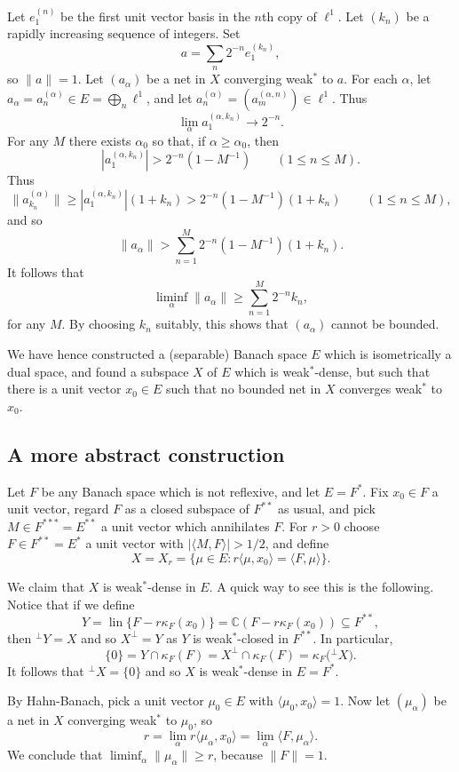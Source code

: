 \documentclass[a4paper,12pt]{article}
\theoremstyle{plain}
\theoremstyle{definition}
\newcommand{\ip}[2]{\langle{#1},{#2}\rangle}
\newcommand{\lin}{\operatorname{lin}}
\begin{document}
Let $e^{(n)}_1$ be the first unit vector basis in the $n$th copy of $\ell^1$.  Let $(k_n)$ be a
rapidly increasing sequence of integers.  Set
\[ a = \sum_n 2^{-n} e^{(k_n)}_1, \]
so $\|a\|=1$.  Let $(a_\alpha)$ be a net in $X$ converging weak$^*$ to $a$.  For each $\alpha$,
let $a_\alpha = a^{(\alpha)}_n \in E = \bigoplus_n \ell^1$, and let $a^{(\alpha)}_n
= (a^{(\alpha,n)}_m) \in \ell^1$.  Thus
\[ \lim_\alpha a^{(\alpha,k_n)}_1 \rightarrow 2^{-n}. \]
For any $M$ there exists $\alpha_0$ so that, if $\alpha\geq \alpha_0$, then
\[ |a^{(\alpha,k_n)}_1| > 2^{-n}(1-M^{-1}) \qquad (1 \leq n \leq M). \]
Thus
\[ \|a^{(\alpha)}_{k_n}\| \geq |a^{(\alpha,k_n)}_1|(1+k_n) > 2^{-n}(1-M^{-1})(1+k_n)
\qquad (1 \leq n \leq M), \]
and so
\[ \|a_\alpha\| > \sum_{n=1}^M 2^{-n}(1-M^{-1})(1+k_n). \]
It follows that
\[ \liminf_\alpha \|a_\alpha\| \geq \sum_{n=1}^M 2^{-n}k_n, \]
for any $M$.  By choosing $k_n$ suitably, this shows that $(a_\alpha)$ cannot be bounded.

We have hence constructed a (separable) Banach space $E$ which is isometrically a dual space,
and found a subspace $X$ of $E$ which is weak$^*$-dense, but such that there is a unit vector
$x_0\in E$ such that no bounded net in $X$ converges weak$^*$ to $x_0$.


\subsection{A more abstract construction}

Let $F$ be any Banach space which is not reflexive, and let $E=F^*$.  Fix $x_0\in F$ a unit vector,
regard $F$ as a closed subspace of $F^{**}$ as usual, and pick $M\in F^{***}=E^{**}$ a unit vector
which annihilates $F$.  For $r>0$ choose $F\in F^{**} = E^*$ a unit vector with $|\ip{M}{F}|
> 1/2$, and define
\[ X = X_r = \{ \mu\in E : r \ip{\mu}{x_0} = \ip{F}{\mu} \}. \]

We claim that $X$ is weak$^*$-dense in $E$.  A quick way to see this is the following.  Notice that
if we define
\[ Y = \lin\{ F-r\kappa_F(x_0) \} = \mathbb C (F-r\kappa_F(x_0)) \subseteq F^{**}, \]
then ${}^\perp Y = X$ and so $X^\perp = Y$ as $Y$ is weak$^*$-closed in $F^{**}$.
In particular,
\[ \{0\} = Y \cap \kappa_F(F) = X^\perp \cap \kappa_F(F) = \kappa_F\big( {}^\perp X \big). \]
It follows that ${}^\perp X = \{0\}$ and so $X$ is weak$^*$-dense in $E=F^*$.

By Hahn-Banach, pick a unit vector $\mu_0\in E$ with $\ip{\mu_0}{x_0}=1$.
Now let $(\mu_\alpha)$ be a net in $X$ converging weak$^*$ to $\mu_0$, so
\[ r = \lim_\alpha r \ip{\mu_\alpha}{x_0} = \lim_\alpha \ip{F}{\mu_\alpha}. \]
We conclude that $\liminf_\alpha \|\mu_\alpha\| \geq r$, because $\|F\|=1$.
\end{document}
